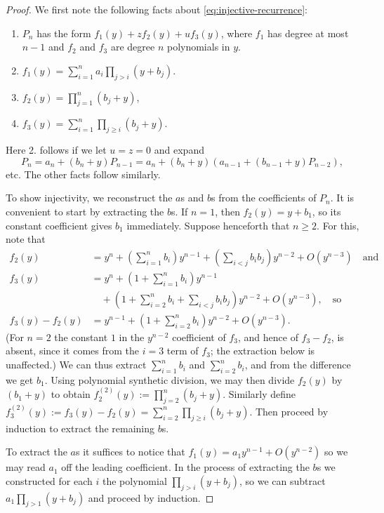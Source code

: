 \begin{proof}
   We first note the following facts about \eqref{eq:injective-recurrence}:
   \begin{enumerate}
      \item $P_n$ has the form $f_1(y) + z f_2(y) + u f_3(y)$,
         where $f_1$ has degree at most $n-1$ and $f_2$ and $f_3$ are degree $n$ polynomials in $y$.
      \item $f_1(y) = \sum_{i=1}^n a_i \prod_{j>i}(y+b_j)$.
      \item $f_2(y) = \prod_{j=1}^n (b_j + y)$,
      \item $f_3(y) = \sum_{i=1}^n \prod_{j\ge i} (b_j+y)$.
   \end{enumerate}
   Here 2. follows if we let $u=z=0$ and expand
   \[P_n=a_n+(b_n+y)P_{n-1}=a_n+(b_n+y)(a_{n-1}+(b_{n-1}+y)P_{n-2}),\]
   etc.
   The other facts follow similarly.

   To show injectivity, we reconstruct the $a$s and $b$s from the coefficients
   of $P_n$.
   It is convenient to start by extracting the $b$s.
   If $n=1$, then $f_2(y)=y+b_1$, so its constant coefficient gives $b_1$
   immediately.  Suppose henceforth that $n\ge2$.
   For this, note that
   \begin{align}
      f_2(y) &= y^n + (\sum_{i=1}^n b_i) y^{n-1} + (\sum_{i<j} b_i b_j) y^{n-2} + O(y^{n-3})
      \quad\text{and}\\
      f_3(y) &= y^{n} + (1+\sum_{i=1}^n b_i) y^{n-1} \\
             &\quad + (1 + \sum_{i=2}^n b_i + \sum_{i<j} b_i b_j) y^{n-2} + O(y^{n-3}),
      \quad\text{so}\\
      f_3(y)-f_2(y) &= y^{n-1} + (1 + \sum_{i=2}^n b_i) y^{n-2} + O(y^{n-3}).
   \end{align}
   (For $n=2$ the constant $1$ in the $y^{n-2}$ coefficient of $f_3$, and hence of $f_3-f_2$, is absent, since it comes from the $i=3$ term of $f_3$; the extraction below is unaffected.)
   We can thus extract $\sum_{i=1}^n b_i$ and $\sum_{i=2}^n b_i$, and from the difference we get $b_1$.
   Using polynomial synthetic division, we may then divide $f_2(y)$ by $(b_1+y)$ to obtain $f_2^{(2)}(y) := \prod_{j=2}^n (b_j + y)$.
   Similarly define $f_3^{(2)}(y) := f_3(y)-f_2(y)=\sum_{i=2}^n \prod_{j\ge i} (b_j+y)$.
   Then proceed by induction to extract the remaining $b$s.

   To extract the $a$s it suffices to notice that $f_1(y) = a_1 y^{n-1} + O(y^{n-2})$ so we may read $a_1$ off the leading coefficient.
   In the process of extracting the $b$s we constructed for each $i$ the polynomial $\prod_{j>i}(y+b_j)$, so we can subtract $a_1\prod_{j>1}(y+b_j)$ and proceed by induction.


\end{proof}
